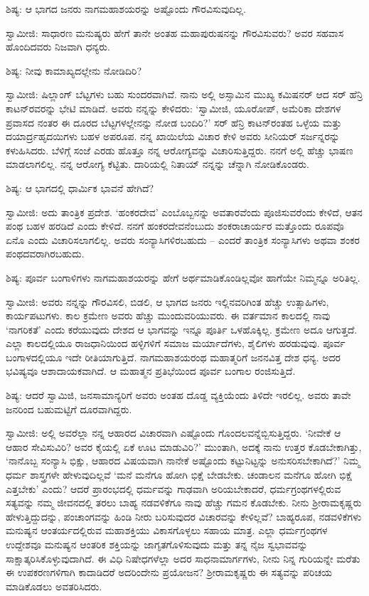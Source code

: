 ಶಿಷ್ಯ: ಆ ಭಾಗದ ಜನರು ನಾಗಮಹಾಶಯರನ್ನು ಅಷ್ಟೊಂದು ಗೌರವಿಸುವುದಿಲ್ಲ.

ಸ್ವಾಮೀಜಿ: ಸಾಧಾರಣ ಮನುಷ್ಯರು ಹೇಗೆ ತಾನೇ ಅಂತಹ ಮಹಾಪುರುಷನನ್ನು ಗೌರವಿಸುವರು? ಅವರ ಸಹವಾಸ ಹೊಂದಿದವರು ನಿಜವಾಗಿ ಧನ್ಯರು.

ಶಿಷ್ಯ: ನೀವು ಕಾಮಾಖ್ಯದಲ್ಲೇನು ನೋಡಿದಿರಿ?

ಸ್ವಾಮೀಜಿ: ಷಿಲ್ಲಾಂಗ್ ಬೆಟ್ಟಗಳು ಬಹು ಸುಂದರವಾಗಿವೆ. ನಾನು ಅಲ್ಲಿ ಅಸ್ಸಾಮಿನ ಮುಖ್ಯ ಕಮಿಷನರ್ ಆದ ಸರ್ ಹೆನ್ರಿ ಕಾಟನ್‌ರವರನ್ನು ಭೇಟಿ ಮಾಡಿದೆ. ಅವರು ನನ್ನನ್ನು ಕೇಳಿದರು: ‘ಸ್ವಾಮೀಜಿ, ಯೂರೋಪ್, ಅಮೆರಿಕಾ ದೇಶಗಳ ಪ್ರವಾಸದ ನಂತರ ಈ ದೂರದ ಬೆಟ್ಟಗಳಲ್ಲೇನನ್ನು ನೋಡ ಬಂದಿರಿ?’ ಸರ್ ಹೆನ್ರಿ ಕಾಟನ್‌ರಂತಹ ಒಳ್ಳೆಯ ಮತ್ತು ದಯಾರ್ದ್ರಹೃದಯಿಗಳು ಬಹಳ ಅಪರೂಪ. ನನ್ನ ಖಾಯಿಲೆಯ ವಿಚಾರ ಕೇಳಿ ಅವರು ಸೀನಿಯರ್ ಸರ್ಜನ್ನರನ್ನು ಕಳುಹಿಸಿದರು. ಬೆಳಿಗ್ಗೆ ಸಂಜೆ ಎರಡು ಹೊತ್ತೂ ನನ್ನ ಆರೋಗ್ಯವನ್ನು ವಿಚಾರಿಸುತ್ತಿದ್ದರು. ನನಗೆ ಅಲ್ಲಿ ಹೆಚ್ಚು ಭಾಷಣ ಮಾಡಲಾಗಲಿಲ್ಲ. ನನ್ನ ಆರೋಗ್ಯ ಕೆಟ್ಟಿತು. ದಾರಿಯಲ್ಲಿ ನಿತಾಯ್ ನನ್ನನ್ನು ಚೆನ್ನಾಗಿ ನೋಡಿಕೊಂಡರು.

ಶಿಷ್ಯ: ಆ ಭಾಗದಲ್ಲಿ ಧಾರ್ಮಿಕ ಭಾವನೆ ಹೇಗಿದೆ?

ಸ್ವಾಮೀಜಿ: ಅದು ತಾಂತ್ರಿಕ ಪ್ರದೇಶ. ‘ಹಂಕರದೇವ’ ಎಂಬೊಬ್ಬನನ್ನು ಅವತಾರವೆಂದು ಪೂಜಿಸುವರೆಂದು ಕೇಳಿದೆ, ಆತನ ಪಂಥ ಬಹಳ ಹರಡಿದೆ ಎಂದು ಕೇಳಿದೆ. ನನಗೆ ಹಂಕರದೇವನೆಂಬುದು ಶಂಕರಾಚಾರ್ಯರ ಮತ್ತೊಂದು ರೂಪವೊ ಏನೊ ಎಂದು ವಿಚಾರಿಸಲಾಗಲಿಲ್ಲ. ಅವರು ಸಂನ್ಯಾಸಿಗಳಿರಬಹುದು – ಎಂದರೆ ತಾಂತ್ರಿಕ ಸಂನ್ಯಾಸಿಗಳು ಅಥವಾ ಶಂಕರ ಪಂಥದವರಾಗಿರಬಹುದು.

ಶಿಷ್ಯ: ಪೂರ್ವ ಬಂಗಾಳಿಗಳು ನಾಗಮಹಾಶಯರನ್ನು ಹೇಗೆ ಅರ್ಥಮಾಡಿಕೊಂಡಿಲ್ಲವೋ ಹಾಗೆಯೇ ನಿಮ್ಮನ್ನೂ ಅರಿತಿಲ್ಲ.

ಸ್ವಾಮೀಜಿ: ಅವರು ನನ್ನನ್ನು ಗೌರವಿಸಲಿ, ಬಿಡಲಿ, ಆ ಭಾಗದ ಜನರು ಇಲ್ಲಿನವರಿಗಿಂತ ಹೆಚ್ಚು ಉತ್ಸಾಹಿಗಳು, ಕಾರ್ಯಪಟುಗಳು. ಕಾಲ ಕ್ರಮೇಣ ಅವರು ಹೆಚ್ಚು ಮುಂದುವರಿಯುವರು. ಈ ವರ್ತಮಾನ ಕಾಲದಲ್ಲಿ ನಾವು ‘ನಾಗರಿಕತೆ’ ಎಂದು ಕರೆಯುವುದು ದೇಶದ ಆ ಭಾಗವನ್ನು ಇನ್ನೂ ಪೂರ್ತಿ ಒಳಹೊಕ್ಕಿಲ್ಲ. ಕ್ರಮೇಣ ಅದೂ ಆಗುತ್ತದೆ. ಎಲ್ಲಾ ಕಾಲದಲ್ಲಿಯೂ ರಾಜಧಾನಿಯಿಂದ ಹಳ್ಳಿಗಳಿಗೆ ಸಮಾಜ ಮರ್ಯಾದೆಗಳು, ಶೈಲಿಗಳು ಹರಡುವುವು. ಪೂರ್ವ ಬಂಗಾಳದಲ್ಲಿಯೂ ಇದೇ ರೀತಿಯಾಗುತ್ತಿದೆ. ನಾಗಮಹಾಶಯರಂಥ ಮಹಾತ್ಮರಿಗೆ ಜನನವಿತ್ತ ದೇಶ ಧನ್ಯ. ಅದರ ಭವಿಷ್ಯವೂ ಆಶಾದಾಯಕವಾಗಿದೆ. ಆ ಮಹಾತ್ಮನ ಪ್ರತಿಭೆಯಿಂದ ಪೂರ್ವ ಬಂಗಾಲ ರಂಜಿಸುತ್ತಿದೆ.

ಶಿಷ್ಯ: ಆದರೆ ಸ್ವಾಮಿಜಿ, ಜನಸಾಮಾನ್ಯರಿಗೆ ಅವರು ಅಂತಹ ದೊಡ್ಡ ವ್ಯಕ್ತಿಯೆಂದು ತಿಳಿದೇ ಇರಲಿಲ್ಲ. ಅವರು ತಾವೇ ಜನರಿಂದ ಬಹುಮಟ್ಟಿಗೆ ದೂರವಾಗಿದ್ದರು.

ಸ್ವಾಮೀಜಿ: ಅಲ್ಲಿ ಅವರೆಲ್ಲಾ ನನ್ನ ಆಹಾರದ ವಿಚಾರವಾಗಿ ಎಷ್ಟೊಂದು ಗೊಂದಲವನ್ನೆಬ್ಬಿಸುತ್ತಿದ್ದರು. ‘ನೀವೇಕೆ ಆ ಆಹಾರ ಸೇವಿಸುವಿರಿ? ಅವರ ಕೈಯಲ್ಲಿ ಏಕೆ ಊಟ ಮಾಡುವಿರಿ?’ ಮುಂತಾಗಿ, ಅದಕ್ಕೆ ನಾನು ಉತ್ತರ ಕೊಡಬೇಕಾಗಿತ್ತು, ‘ನಾನೊಬ್ಬ ಸಂನ್ಯಾಸಿ ಭಿಕ್ಷು, ಆಹಾರದ ವಿಷಯವಾಗಿ ನಾನೇಕೆ ಅಷ್ಟೊಂದು ಕಟ್ಟುನಿಟ್ಟನ್ನು ಅನುಸರಿಸಬೇಕಾಗಿದೆ?’ ನಿಮ್ಮ ಧರ್ಮ ಶಾಸ್ತ್ರಗಳೇ ಹೇಳುವುದಿಲ್ಲವೆ ‘ಮನೆ ಮನೆಗೂ ಹೋಗಿ ಭಿಕ್ಷೆ ಬೇಡಬೇಕು. ಚಂಡಾಲನ ಮನೆಗೂ ಹೋಗಿ ಭಿಕ್ಷೆ ಎತ್ತಬೇಕು’ ಎಂದು? ಆದರೆ ಪ್ರಾರಂಭದಲ್ಲಿ ಧರ್ಮವನ್ನು ಗಾಢವಾಗಿ ಅರಿಯಬೇಕಾದರೆ, ಧರ್ಮಗ್ರಂಥಗಳಲ್ಲಿರುವ ಸತ್ಯವನ್ನು ನಮ್ಮ ಜೀವನದಲ್ಲಿ ತರಲು ಬಾಹ್ಯ ನಡವಳಿಕೆಗೂ ನಾವು ಹೆಚ್ಚು ಗಮನ ಕೊಡಬೇಕು. ನೀನು ಶ‍್ರೀರಾಮಕೃಷ್ಣರು ಹೇಳುತ್ತಿದ್ದುದನ್ನು, ಪಂಚಾಂಗವನ್ನು ಹಿಂಡಿ ನೀರು ಬರಿಸುವುದರ ವಿಚಾರವನ್ನು ಕೇಳಿಲ್ಲವೆ? ಬಾಹ್ಯರೂಪ, ನಡವಳಿಕೆಗಳು ಮನುಷ್ಯನ ಆಂತರ್ಯದಲ್ಲಿರುವ ಮಹಾಶಕ್ತಿಯು ವಿಕಾಸಗೊಳ್ಳಲು ಸಹಾಯ ಮಾತ್ರ. ಎಲ್ಲಾ ಧರ್ಮಗ್ರಂಥಗಳ ಉದ್ದೇಶವೂ ಮನುಷ್ಯನ ಆಂತರಿಕ ಶಕ್ತಿಯನ್ನು ಜಾಗೃತಗೊಳಿಸುವುದು ಮತ್ತು ತನ್ನ ನೈಜ ಸ್ವಭಾವವನ್ನು ಸಾಕ್ಷಾತ್ಕರಿಸಿಕೊಳ್ಳುವುದಾಗಿದೆ. ಈ ವಿಧಿ ನಿಷೇಧಗಳೆಲ್ಲಾ ಅದರ ಸಾಧನಾಮಾರ್ಗಗಳು, ನೀನು ನಿನ್ನ ಗುರಿಯನ್ನೇ ಮರೆತು ಈ ಉಪಕರಣಗಳಿಗಾಗಿ ಕಾದಾಡಿದರೆ ಅದರಿಂದೇನು ಪ್ರಯೋಜನ? ಶ‍್ರೀರಾಮಕೃಷ್ಣರು ಈ ಸತ್ಯವನ್ನು ಪರಿಚಯ ಮಾಡಿಕೊಡಲು ಅವತರಿಸಿದರು.

